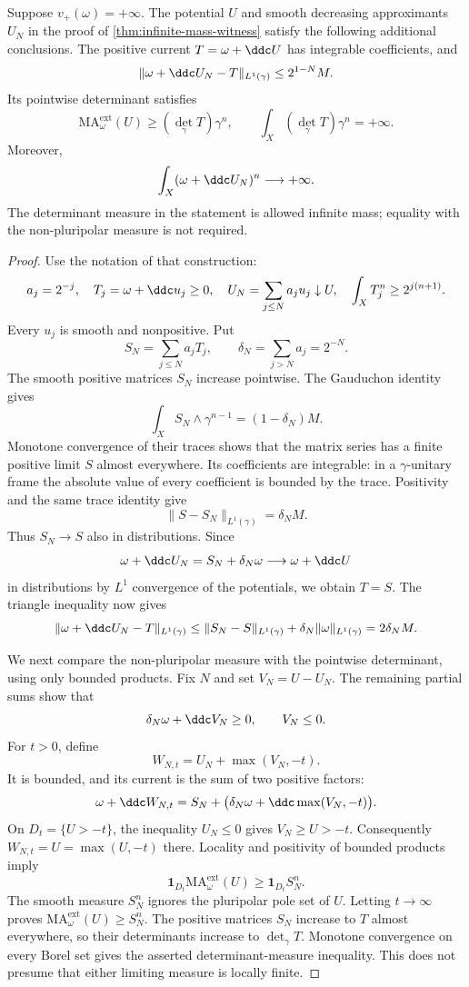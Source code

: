 \begin{proposition}\label{prop:integrable-infinite-mass}
Suppose $v_+(\omega)=+\infty$. The potential $U$ and smooth decreasing approximants $U_N$ in the proof of \cref{thm:infinite-mass-witness} satisfy the following additional conclusions. The positive current $T=\omega+\ddc U$ has integrable coefficients, and
\[
 \|\omega+\ddc U_N-T\|_{L^1(\gamma)}
 \leq2^{1-N}M.
\]
Its pointwise determinant satisfies
\[
 \mathrm{MA}^{\mathrm{ext}}_\omega(U)
 \geq (\det_\gamma T)\gamma^n,
 \qquad
 \int_X(\det_\gamma T)\gamma^n=+\infty.
\]
Moreover,
\[
 \int_X(\omega+\ddc U_N)^n\longrightarrow+\infty.
\]
The determinant measure in the statement is allowed infinite mass; equality with the non-pluripolar measure is not required.
\end{proposition}
\begin{proof}
Use the notation of that construction:
\[
 a_j=2^{-j},\quad T_j=\omega+\ddc u_j\geq0,\quad
 U_N=\sum_{j\leq N}a_ju_j\downarrow U,\quad
 \int_XT_j^n\geq2^{j(n+1)}.
\]
Every $u_j$ is smooth and nonpositive. Put
\[
 S_N=\sum_{j\leq N}a_jT_j,\qquad
 \delta_N=\sum_{j>N}a_j=2^{-N}.
\]
The smooth positive matrices $S_N$ increase pointwise. The Gauduchon identity gives
\[
 \int_XS_N\wedge\gamma^{n-1}=(1-\delta_N)M.
\]
Monotone convergence of their traces shows that the matrix series has a finite positive limit $S$ almost everywhere. Its coefficients are integrable: in a $\gamma$-unitary frame the absolute value of every coefficient is bounded by the trace. Positivity and the same trace identity give
\[
 \|S-S_N\|_{L^1(\gamma)}=\delta_N M.
\]
Thus $S_N\to S$ also in distributions. Since
\[
 \omega+\ddc U_N=S_N+\delta_N\omega
 \longrightarrow\omega+\ddc U
\]
in distributions by $L^1$ convergence of the potentials, we obtain $T=S$. The triangle inequality now gives
\[
 \|\omega+\ddc U_N-T\|_{L^1(\gamma)}
 \leq\|S_N-S\|_{L^1(\gamma)}
       +\delta_N\|\omega\|_{L^1(\gamma)}
 =2\delta_N M.
\]

We next compare the non-pluripolar measure with the pointwise determinant, using only bounded products. Fix $N$ and set $V_N=U-U_N$. The remaining partial sums show that
\[
 \delta_N\omega+\ddc V_N\geq0,\qquad V_N\leq0.
\]
For $t>0$, define
\[
 W_{N,t}=U_N+\max(V_N,-t).
\]
It is bounded, and its current is the sum of two positive factors:
\[
 \omega+\ddc W_{N,t}
 =S_N+\bigl(\delta_N\omega+\ddc\max(V_N,-t)\bigr).
\]
On $D_t=\{U>-t\}$, the inequality $U_N\leq0$ gives $V_N\geq U>-t$. Consequently $W_{N,t}=U=\max(U,-t)$ there. Locality and positivity of bounded products imply
\[
 \mathbf1_{D_t}\mathrm{MA}^{\mathrm{ext}}_\omega(U)
 \geq\mathbf1_{D_t}S_N^n.
\]
The smooth measure $S_N^n$ ignores the pluripolar pole set of $U$. Letting $t\to\infty$ proves
$\mathrm{MA}^{\mathrm{ext}}_\omega(U)\geq S_N^n$.
The positive matrices $S_N$ increase to $T$ almost everywhere, so their determinants increase to $\det_\gamma T$. Monotone convergence on every Borel set gives the asserted determinant-measure inequality. This does not presume that either limiting measure is locally finite.


\end{proof}
